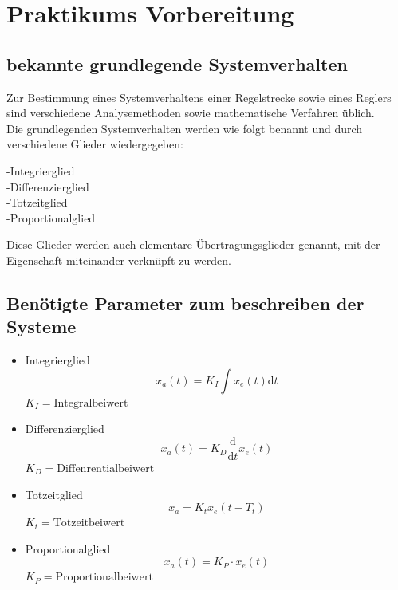 \documentclass[12pt, oneside, a4paper]{scrreprt}
\newcommand{\dt}{\ensuremath{\mathrm{d}t}}
\begin{document}
\tableofcontents



\chapter{Praktikums Vorbereitung}
\label{Praktikumsvorbereitung}
\section{bekannte grundlegende Systemverhalten}
Zur Bestimmung eines Systemverhaltens einer Regelstrecke sowie eines Reglers sind verschiedene Analysemethoden sowie mathematische Verfahren üblich.\\
Die grundlegenden Systemverhalten werden wie folgt benannt und durch verschiedene Glieder wiedergegeben:
\begin{center}
          -Integrierglied\\
          \label{1}
          -Differenzierglied\\
          \label{2}
          -Totzeitglied\\
          \label{3}
          -Proportionalglied\\ 
          \label{4}
          \end{center}
Diese Glieder werden auch elementare Übertragungsglieder genannt, mit der Eigenschaft miteinander verknüpft zu werden. 
\section{Benötigte Parameter zum beschreiben der Systeme}
\begin{itemize}

\item Integrierglied
\begin{equation}
x_a(t)=K_I\int x_e(t)\dt
\end{equation}
$K_I=\text{Integralbeiwert}$
\item Differenzierglied
\begin{equation}
x_a(t)=K_D\frac{\mathrm{d}}{\dt} x_e(t)
\end{equation}
$K_D=\text{Diffenrentialbeiwert}$
\item Totzeitglied
\begin{equation}
x_a=K_tx_e(t-T_t)
\end{equation}
$K_t=\text{Totzeitbeiwert}$
\item Proportionalglied
\begin{equation}
x_a(t)=K_P\cdot x_e(t)
\end{equation}
$K_P=\text{Proportionalbeiwert}$

\end{itemize}
\end{document}
